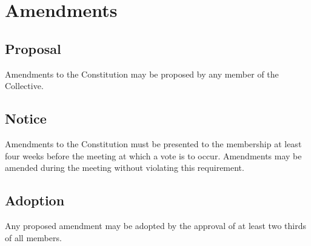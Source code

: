 \chapter{Amendments}

\section{Proposal}\label{sec:proposal}
Amendments to the Constitution may be proposed by any member of the Collective.

\section{Notice}\label{sec:notice}
Amendments to the Constitution must be presented to the membership at least four weeks before the meeting at which a vote is to occur. Amendments may be amended during the meeting without violating this requirement.

\section{Adoption}\label{sec:adoption}
Any proposed amendment may be adopted by the approval of at least two thirds of all members.
